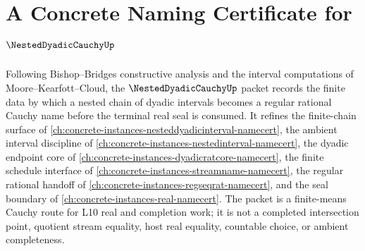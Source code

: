 \chapter{A Concrete Naming Certificate for $\NestedDyadicCauchyUp$}
\label{ch:concrete-instances-nested-dyadic-cauchy-namecert}

Following Bishop--Bridges constructive analysis and the interval computations of Moore--Kearfott--Cloud, the $\NestedDyadicCauchyUp$ packet records the finite data by which a nested chain of dyadic intervals becomes a regular rational Cauchy name before the terminal real seal is consumed. It refines the finite-chain surface of \autoref{ch:concrete-instances-nesteddyadicinterval-namecert}, the ambient interval discipline of \autoref{ch:concrete-instances-nestedinterval-namecert}, the dyadic endpoint core of \autoref{ch:concrete-instances-dyadicratcore-namecert}, the finite schedule interface of \autoref{ch:concrete-instances-streamname-namecert}, the regular rational handoff of \autoref{ch:concrete-instances-regseqrat-namecert}, and the seal boundary of \autoref{ch:concrete-instances-real-namecert}. The packet is a finite-means Cauchy route for L10 real and completion work; it is not a completed intersection point, quotient stream equality, host real equality, countable choice, or ambient completeness.

